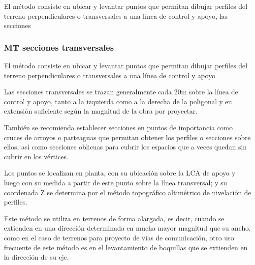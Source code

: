 El método consiste en ubicar y levantar puntos que permitan dibujar perfiles del terreno perpendiculares o transversales a una línea de control y apoyo,
las secciones 

\subsubsection{MT secciones transversales}

El método consiste en ubicar y levantar puntos que permitan dibujar perfiles del terreno perpendiculares o transversales a una línea de control y apoyo

Las secciones transversales se trazan generalmente cada 20m sobre la línea de control y apoyo, tanto a la izquierda como a la derecha de la poligonal y en extensión suficiente según la magnitud de la obra por proyectar.

También se recomienda establecer secciones en puntos de importancia como cruces de arroyos o parteaguas que permitan obtener los perfiles o secciones sobre ellos, así como secciones oblicuas para cubrir los espacios que a veces quedan sin cubrir en los vértices.

Los puntos se localizan en planta, con su ubicación sobre la LCA de apoyo y luego con su medida a partir de este punto sobre la línea transversal; y su coordenada Z se determina por el método topográfico altimétrico de nivelación de perfiles.

Este método se utiliza en terrenos de forma alargada, es decir, cuando se extienden en una dirección determinada en mucha mayor magnitud que su ancho, como en el caso de terrenos para proyecto de vías de comunicación, otro uso frecuente de este método es en el levantamiento de boquillas que se extienden en la dirección de su eje.

